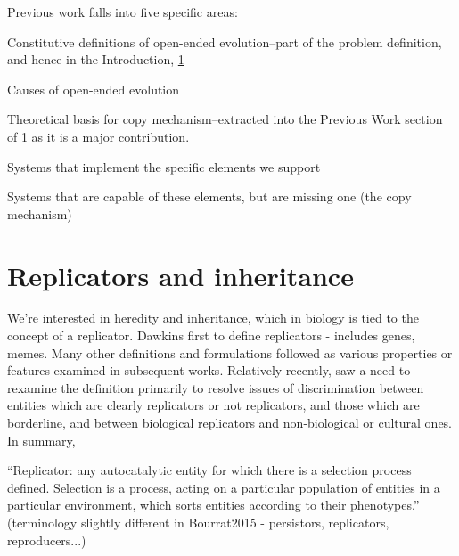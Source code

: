 
Previous work falls into five specific areas:
\begin{compactenum}
\item Constitutive definitions of open-ended evolution--part of the problem definition, and hence in the Introduction, \ref{}
\item Causes of open-ended evolution
\item Theoretical basis for copy mechanism--extracted into the Previous Work section of \ref{} as it is a major contribution.
\item Systems that implement the specific elements we support
\item Systems that are capable of these elements, but are missing one (the copy mechanism)
\end{compactenum}

\section{Replicators and inheritance}

We're interested in heredity and inheritance, which in biology is tied to the concept of a replicator. Dawkins first to define replicators - includes genes, memes. Many other definitions and formulations followed as various properties or features examined in subsequent works. Relatively recently, \cite{Zachar2010} saw a need to rexamine the definition primarily to resolve issues of discrimination between entities which are clearly replicators or not replicators, and those which are borderline, and between biological replicators and non-biological or cultural ones. In summary,

``Replicator: any autocatalytic entity for which there is a selection process defined. Selection is a process, acting on a particular population of entities in a particular environment, which sorts entities according to their phenotypes.'' \parencite[p.21]{Zachar2010} (terminology slightly different in Bourrat2015 - persistors, replicators, reproducers...)

